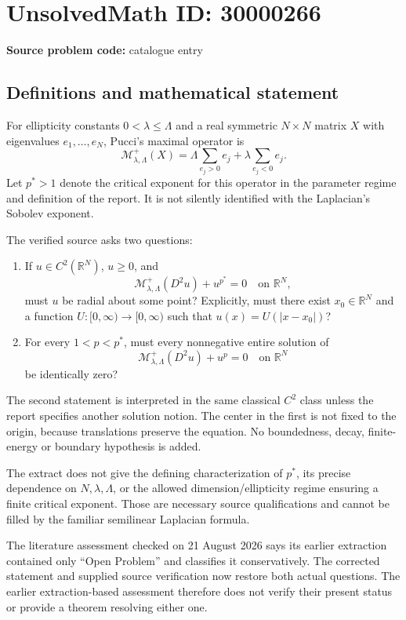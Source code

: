 \documentclass[11pt]{article}
\newcommand{\R}{\mathbb{R}}
\begin{document}
\section*{UnsolvedMath ID: 30000266}
\textbf{Source problem code:} catalogue entry
\subsection{Definitions and mathematical statement}
For ellipticity constants $0<\lambda\le\Lambda$ and a real symmetric $N\times N$ matrix $X$ with eigenvalues $e_1,\ldots,e_N$, Pucci's maximal operator is
\[
 \mathcal M^+_{\lambda,\Lambda}(X)
   =\Lambda\sum_{e_j>0}e_j+\lambda\sum_{e_j<0}e_j.
\]
Let $p^*>1$ denote the critical exponent for this operator in the parameter regime and definition of the report. It is not silently identified with the Laplacian's Sobolev exponent.

The verified source asks two questions:
\begin{enumerate}
\item If $u\in C^2(\R^N)$, $u\ge0$, and
\[
 \mathcal M^+_{\lambda,\Lambda}(D^2u)+u^{p^*}=0\quad\text{on }\R^N,
\]
must $u$ be radial about some point? Explicitly, must there exist $x_0\in\R^N$ and a function $U:[0,\infty)\to[0,\infty)$ such that $u(x)=U(|x-x_0|)$?
\item For every $1<p<p^*$, must every nonnegative entire solution of
\[
 \mathcal M^+_{\lambda,\Lambda}(D^2u)+u^p=0\quad\text{on }\R^N
\]
be identically zero?
\end{enumerate}
The second statement is interpreted in the same classical $C^2$ class unless the report specifies another solution notion. The center in the first is not fixed to the origin, because translations preserve the equation. No boundedness, decay, finite-energy or boundary hypothesis is added.

The extract does not give the defining characterization of $p^*$, its precise dependence on $N,\lambda,\Lambda$, or the allowed dimension/ellipticity regime ensuring a finite critical exponent. Those are necessary source qualifications and cannot be filled by the familiar semilinear Laplacian formula.

The literature assessment checked on 21 August 2026 says its earlier extraction contained only ``Open Problem'' and classifies it conservatively. The corrected statement and supplied source verification now restore both actual questions. The earlier extraction-based assessment therefore does not verify their present status or provide a theorem resolving either one.
\end{document}
